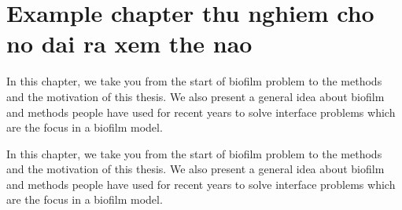 \documentclass[../main.tex]{subfiles}
\begin{document}
\chapter{Example chapter thu nghiem cho no dai ra xem the nao}

In this chapter, we take you from the start of biofilm problem to the methods and the motivation of this thesis. We also present a general idea about biofilm and methods people have used for recent years to solve interface problems which are the focus in a biofilm model.


\pagebreak

In this chapter, we take you from the start of biofilm problem to the methods and the motivation of this thesis. We also present a general idea about biofilm and methods people have used for recent years to solve interface problems which are the focus in a biofilm model.
\end{document}
